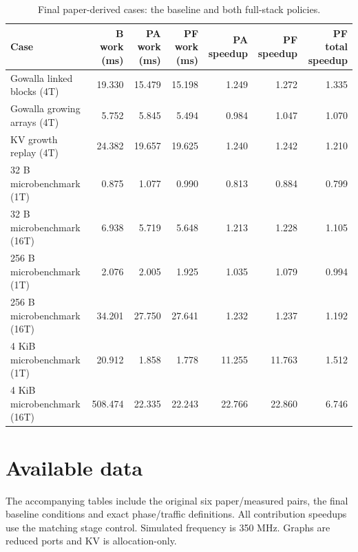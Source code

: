 \documentclass[conference,onecolumn]{IEEEtran}
\begin{document}
\begin{table}[!htbp]
\caption{Final paper-derived cases: the baseline and both full-stack policies.}\label{tab:paper-final}
\centering\small
\begin{tabular}{lrrrrrr}\toprule
Case & B work (ms) & PA work (ms) & PF work (ms) & PA speedup & PF speedup & PF total speedup \\ \midrule
Gowalla linked blocks (4T) & 19.330 & 15.479 & 15.198 & 1.249 & 1.272 & 1.335 \\
Gowalla growing arrays (4T) & 5.752 & 5.845 & 5.494 & 0.984 & 1.047 & 1.070 \\
KV growth replay (4T) & 24.382 & 19.657 & 19.625 & 1.240 & 1.242 & 1.210 \\
32 B microbenchmark (1T) & 0.875 & 1.077 & 0.990 & 0.813 & 0.884 & 0.799 \\
32 B microbenchmark (16T) & 6.938 & 5.719 & 5.648 & 1.213 & 1.228 & 1.105 \\
256 B microbenchmark (1T) & 2.076 & 2.005 & 1.925 & 1.035 & 1.079 & 0.994 \\
256 B microbenchmark (16T) & 34.201 & 27.750 & 27.641 & 1.232 & 1.237 & 1.192 \\
4 KiB microbenchmark (1T) & 20.912 & 1.858 & 1.778 & 11.255 & 11.763 & 1.512 \\
4 KiB microbenchmark (16T) & 508.474 & 22.335 & 22.243 & 22.766 & 22.860 & 6.746 \\
\bottomrule\end{tabular}
\par\vspace{2pt}{\footnotesize Graph cases are reduced ports; KV is an allocation-only replay and excludes attention/serving. Original request sizes and 128 microbenchmark requests/tasklet are retained. Values below one are regressions.}
\end{table}

\section{Available data}
The accompanying tables include the original six paper/measured pairs, the final baseline conditions and exact phase/traffic definitions. All contribution speedups use the matching stage control. Simulated frequency is 350 MHz. Graphs are reduced ports and KV is allocation-only.
\end{document}
